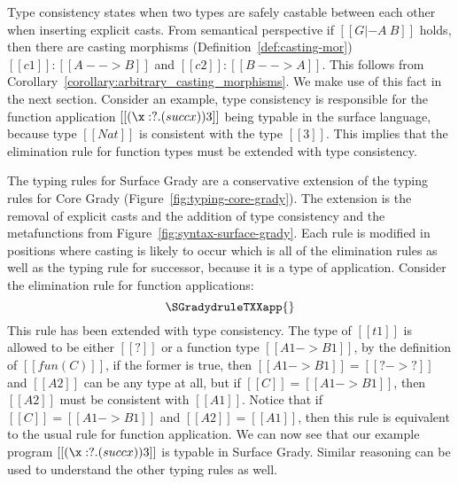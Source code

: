 Type consistency states when two types are safely castable between
each other when inserting explicit casts.  From semantical perspective
if $[[G |- A ~ B]]$ holds, then there are casting morphisms
(Definition~\ref{def:casting-mor}) $[[c1]] : [[A --> B]]$ and $[[c2]]
: [[B --> A]]$.  This follows from
Corollary~\ref{corollary:arbitrary_casting_morphisms}.  We make use of
this fact in the next section. Consider an example, type consistency
is responsible for the function application $[[(\x:?.(succ x)) 3]]$
being typable in the surface language, because type $[[Nat]]$ is
consistent with the type $[[3]]$.  This implies that the elimination
rule for function types must be extended with type consistency.

The typing rules for Surface Grady are a conservative extension of the
typing rules for Core Grady (Figure~\ref{fig:typing-core-grady}). The
extension is the removal of explicit casts and the addition of type
consistency and the metafunctions from
Figure~\ref{fig:syntax-surface-grady}.  Each rule is modified in
positions where casting is likely to occur which is all of the
elimination rules as well as the typing rule for successor, because it
is a type of application.  Consider the elimination rule for function
applications:
\[
\SGradydruleTXXapp{}
\]
This rule has been extended with type consistency.  The type of
$[[t1]]$ is allowed to be either $[[?]]$ or a function type $[[A1 ->
    B1]]$, by the definition of $[[fun(C)]]$, if the former is true,
then $[[A1 -> B1]] = [[? -> ?]]$ and $[[A2]]$ can be any type at all,
but if $[[C]] = [[A1 -> B1]]$, then $[[A2]]$ must be consistent with
$[[A1]]$.  Notice that if $[[C]] = [[A1 -> B1]]$ and $[[A2]] =
[[A1]]$, then this rule is equivalent to the usual rule for function
application. We can now see that our example program $[[(\x:?.(succ
    x)) 3]]$ is typable in Surface Grady.  Similar reasoning can be
used to understand the other typing rules as well.

